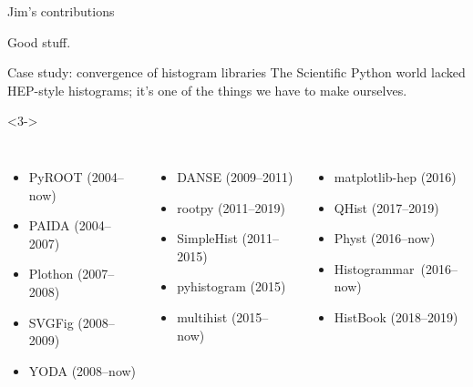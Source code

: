 \begin{frame}{Jim's contributions}
\vspace{0.1 cm}

\Large
Good stuff.

\end{frame}

\begin{frame}{Case study: convergence of histogram libraries}
\vspace{0.5 cm}
The Scientific Python world lacked HEP-style histograms; it's one of the things we have to make ourselves.

\vspace{0.5 cm}

\vspace{0.5 cm}

\vspace{0.5 cm}
\begin{uncoverenv}<3->
\begin{columns}
\scriptsize
{}
\begin{itemize}
\item PyROOT (2004--now)
\item PAIDA (2004--2007)
\item Plothon (2007--2008)
\item SVGFig (2008--2009)
\item YODA (2008--now)
\end{itemize}

\begin{itemize}
\item DANSE (2009--2011)
\item rootpy (2011--2019)
\item SimpleHist (2011--2015)
\item pyhistogram (2015)
\item multihist (2015--now)
\end{itemize}

\begin{itemize}
\item matplotlib-hep (2016)
\item QHist (2017--2019)
\item Physt (2016--now)
\item \mbox{Histogrammar (2016--now)\hspace{-0.2 cm}}
\item HistBook (2018--2019)
\end{itemize}


\end{columns}
\end{uncoverenv}
\end{frame}
